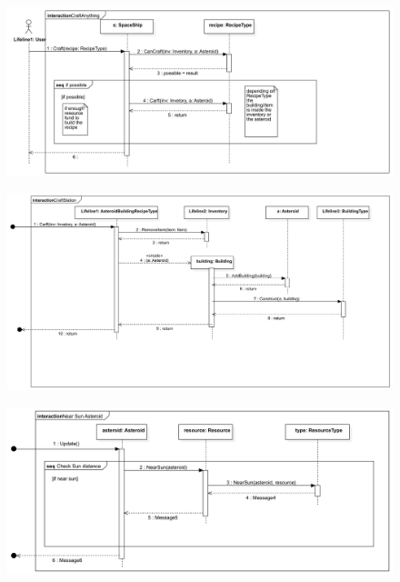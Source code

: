 \documentclass[../../projlab]{subfiles}
\begin{document}
\begin{figure}[H]
	\includegraphics[width=1\textwidth]{docs/2_Project/svg/Design Model!Crafting!Craft!CraftAnything_18.png}
	\centering
\end{figure}

\begin{figure}[H]
	\includegraphics[width=1\textwidth]{docs/2_Project/svg/Design Model!Crafting!Interaction1!CraftStation_20.png}
	\centering
\end{figure}






\begin{figure}[H]
	\includegraphics[width=1\textwidth]{docs/2_Project/svg/Design Model!Sun Distance!Asteroid near sun!Near Sun Asteroid_6.png}
	\centering
\end{figure}
\end{document}
